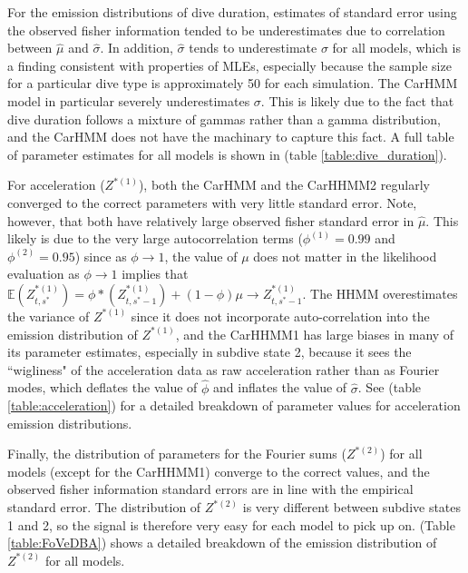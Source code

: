 For the emission distributions of dive duration, estimates of standard error using the observed fisher information tended to be underestimates due to correlation between $\hat \mu$ and $\hat \sigma$. In addition, $\hat \sigma$ tends to underestimate $\sigma$ for all models, which is a finding consistent with properties of MLEs, especially because the sample size for a particular dive type is approximately 50 for each simulation. The CarHMM model in particular severely underestimates $\sigma$. This is likely due to the fact that dive duration follows a mixture of gammas rather than a gamma distribution, and the CarHMM does not have the machinary to capture this fact. A full table of parameter estimates for all models is shown in (table \ref{table:dive_duration}).


For acceleration ($Z^{*(1)}$), both the CarHMM and the CarHHMM2 regularly converged to the correct parameters with very little standard error. Note, however, that both have relatively large observed fisher standard error in $\hat \mu$. This likely is due to the very large autocorrelation terms ($\phi^{(1)} = 0.99$ and $\phi^{(2)} = 0.95$) since as $\phi \to 1$, the value of $\mu$ does not matter in the likelihood evaluation as $\phi \to 1$ implies that $\mathbb{E}(Z^{*(1)}_{t,s^*}) = \phi*(Z^{*(1)}_{t,s^*-1}) + (1-\phi)\mu \to Z^{*(1)}_{t,s^*-1}$. The HHMM overestimates the variance of $Z^{*(1)}$ since it does not incorporate auto-correlation into the emission distribution of $Z^{*(1)}$, and the CarHHMM1 has large biases in many of its parameter estimates, especially in subdive state 2, because it sees the ``wigliness" of the acceleration data as raw acceleration rather than as Fourier modes, which deflates the value of $\hat \phi$ and inflates the value of $\hat \sigma$. See (table \ref{table:acceleration}) for a detailed breakdown of parameter values for acceleration emission distributions.


Finally, the distribution of parameters for the Fourier sums ($Z^{*(2)}$) for all models (except for the CarHHMM1) converge to the correct values, and the observed fisher information standard errors are in line with the empirical standard error. The distribution of $Z^{*(2)}$ is very different between subdive states 1 and 2, so the signal is therefore very easy for each model to pick up on. (Table \ref{table:FoVeDBA}) shows a detailed breakdown of the emission distribution of $Z^{*(2)}$ for all models.

